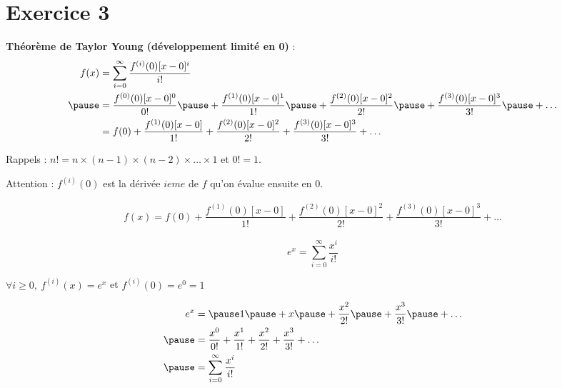 \documentclass[9pt,handout,professionalfonts,hyperref]{beamer}
\begin{document}
\section{Exercice 3}
\begin{frame}
\textbf{Théorème de Taylor Young (développement limité en 0)} :
\pause
\medskip
\[\begin{aligned}
f(x)
&=\sum_{i=0}^{\infty}\dfrac{f^{(i)}(0)[x-0]^i}{i!} \\
\pause &=\dfrac{f^{(0)}(0)[x-0]^0}{0!}\pause +\dfrac{f^{(1)}(0)[x-0]^1}{1!}\pause +\dfrac{f^{(2)}(0)[x-0]^2}{2!}\pause +\dfrac{f^{(3)}(0)[x-0]^3}{3!}\pause +\dots\\
&=f(0)+\dfrac{f^{(1)}(0)[x-0]}{1!}+\dfrac{f^{(2)}(0)[x-0]^2}{2!}+\dfrac{f^{(3)}(0)[x-0]^3}{3!}+\dots
\end{aligned}\]

\medskip
\pause Rappels : $n! = n\times (n-1)\times (n-2)\times \dots\times 1$ \pause et $0! = 1$.

\medskip
\pause Attention : $f^{(i)}(0)$ est la dérivée $ieme$ de $f$ qu'on évalue ensuite en $0$.

\end{frame}

\begin{frame}

\[\begin{aligned}
f(x)=f(0)+\dfrac{f^{(1)}(0)[x-0]}{1!}+\dfrac{f^{(2)}(0)[x-0]^2}{2!}+\dfrac{f^{(3)}(0)[x-0]^3}{3!}+\dots
\end{aligned}\]

$$
e^x=\sum_{i=0}^{\infty} \dfrac{x^i}{i!}
$$
\pause
\medskip

$\forall i\ge0,~f^{(i)}(x) = e^x$ \pause et $f^{(i)}(0) = e^0 =1 $

\pause
\medskip
\[\begin{aligned}
e^x
&=\pause 1\pause +x\pause +\frac{x^2}{2!}\pause +\dfrac{x^3}{3!}\pause +\dots\\
\pause &=\frac{x^0}{0!}+\frac{x^1}{1!}+\frac{x^2}{2!}+\dfrac{x^3}{3!}+\dots\\
\pause &=\sum_{i=0}^{\infty}\dfrac{x^i}{i!}
\end{aligned}\]

\end{frame}
\end{document}
